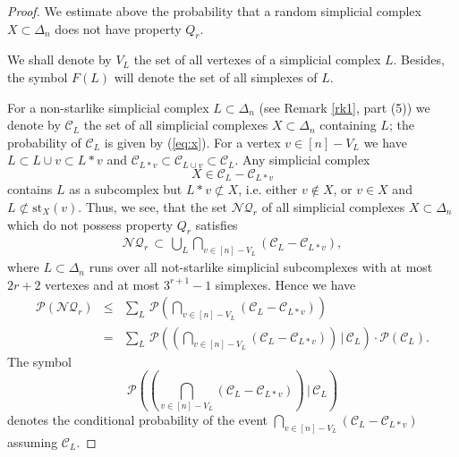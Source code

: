 \documentclass[10pt,a4paper]{amsart}
\newcommand{\st}{\textrm{st}}
\begin{document}
\begin{proof} We estimate above the probability that a random simplicial complex $X\subset \Delta_n$ does not have property $Q_r$.

We shall denote by $V_L$ the set of all vertexes of a simplicial complex $L$. Besides, the symbol $F(L)$ will denote the set of all simplexes of $L$. 

For a non-starlike simplicial complex $L\subset \Delta_n$ (see Remark \ref{rk1}, part (5)) we denote by $\mathcal C_L$ the set of all simplicial complexes $X \subset \Delta_n$ containing $L$; the probability 
of $\mathcal C_L$ is given by (\ref{eq:x}). For a vertex $v\in [n]-V_L$ we have $L\subset L\cup v\subset L\ast v$ and 
$ {\mathcal C}_{L\ast v}\subset \mathcal C_{L\cup v}\subset {\mathcal C}_L$. 
Any simplicial complex $$X\in \mathcal C_{L}- \mathcal C_{L\ast v}$$ contains $L$ as a subcomplex but $L\ast v\not\subset X$, i.e. either $v\notin X$, or $v\in X$ and $L\not\subset \st_X(v)$. 
Thus, we see, that the set ${\mathcal {NQ}}_r$ of all simplicial complexes $X\subset \Delta_n$ which do not possess property $Q_r$ satisfies
\begin{eqnarray*}\label{eq:noqr}
{\mathcal {NQ}}_r \, %
\subset  \, 
\bigcup_L \bigcap_{v\in [n]-V_L}\left(\mathcal C_{L}-\mathcal C_{L\ast v}\right),
\end{eqnarray*}
where $L\subset \Delta_n$ runs over all not-starlike simplicial subcomplexes with at most $ 2r+2$ vertexes and at most $3^{r+1}-1$ simplexes. 
Hence we have
\begin{eqnarray}\label{eq:7}
\mathcal P(\mathcal {NQ}_r) &\le& 
\sum_L \, \mathcal P\left(\bigcap_{v\in [n]-V_L}(\mathcal C_{L}-\mathcal C_{L\ast v})\right) \nonumber\\ 
&=&
\sum_L \, \mathcal P\left(\left(\bigcap_{v\in [n]-V_L}(\mathcal C_{L}-\mathcal C_{L\ast v})\right)\, \big|\, \mathcal C_L\right)\cdot \mathcal P(\mathcal C_L).
\end{eqnarray}
The symbol $$\mathcal P\left(\left(\bigcap_{v\in [n]-V_L}(\mathcal C_{L}-\mathcal C_{L\ast v})\right)\, |\, \mathcal C_L\right)$$ denotes the conditional probability
of the event 
$\bigcap_{v\in [n]-V_L}(\mathcal C_{L}-\mathcal C_{L\ast v})$ assuming $\mathcal C_L$. 


\end{proof}
\end{document}
